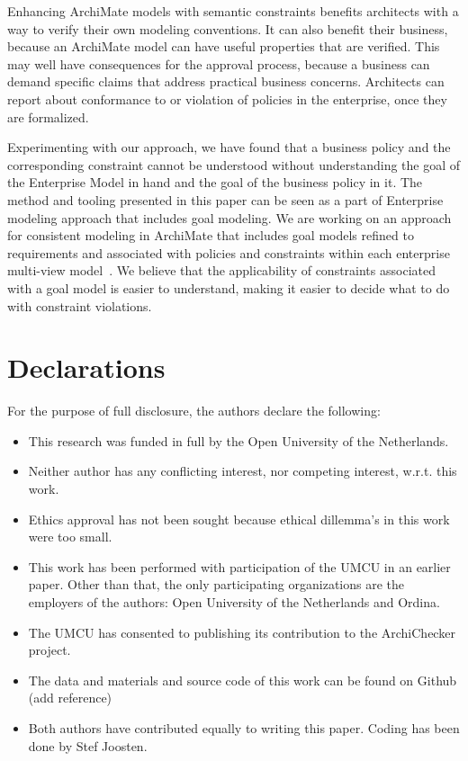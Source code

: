 \documentclass[sn-vancouver]{sn-jnl}%
\theoremstyle{thmstyleone}%
\theoremstyle{thmstyletwo}%
\theoremstyle{thmstylethree}%
\begin{document}
Enhancing ArchiMate models with semantic constraints benefits architects with a way to verify their own modeling conventions.
It can also benefit their business, because an ArchiMate model can have useful properties that are verified.
This may well have consequences for the approval process, because a business can demand specific claims that address practical business concerns.
Architects can report about conformance to or violation of policies in the enterprise, once they are formalized.

Experimenting with our approach, we have found that a business policy and the corresponding constraint cannot be understood 
without understanding the goal of the Enterprise Model in hand and the goal of the business policy in it.
The method and tooling presented in this paper can be seen as a part of Enterprise modeling approach that includes goal modeling.
We are working on an approach for consistent modeling in ArchiMate that includes goal models 
refined to requirements and associated with policies and constraints within each enterprise multi-view model~\cite{severin2022}.
We believe that the applicability of constraints associated with a goal model is easier to understand,
making it easier to decide what to do with constraint violations.

\backmatter


\section*{Declarations}
For the purpose of full disclosure, the authors declare the following:

\begin{itemize}
\item This research was funded in full by the Open University of the Netherlands.
\item Neither author has any conflicting interest, nor competing interest, w.r.t. this work.
\item Ethics approval has not been sought because ethical dillemma's in this work were too small.
\item This work has been performed with participation of the UMCU in an earlier paper.
Other than that, the only participating organizations are the employers of the authors: Open University of the Netherlands and Ordina.
\item The UMCU has consented to publishing its contribution to the ArchiChecker project.
\item The data and materials and source code of this work can be found on Github (add reference)
\item Both authors have contributed equally to writing this paper. Coding has been done by Stef Joosten.
\end{itemize}
\end{document}
